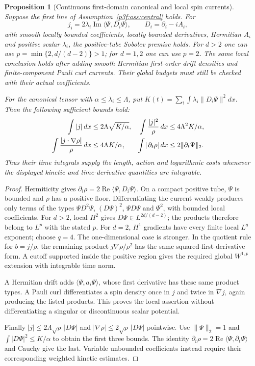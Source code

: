 \documentclass[11pt]{article}
\numberwithin{equation}{section}
\newtheorem{proposition}[theorem]{Proposition}
\theoremstyle{definition}
\theoremstyle{remark}
\begin{document}
\begin{proposition}[Continuous first-domain canonical and local spin currents]
\label{p3f:prop:canonical}
Suppose the first line of Assumption~\ref{p3f:ass:central} holds.
For
\[
 j_i=2\lambda_i\operatorname{Im}\langle\Psi,D_i\Psi\rangle,
 \qquad D_i=\partial_i-iA_i,
\]
with smooth locally bounded coefficients, locally bounded derivatives,
Hermitian $A_i$ and positive scalar $\lambda_i$, the positive-tube
Sobolev premise holds. For $d>2$ one can use
$p=\min\{2,d/(d-2)\}>1$; for $d=1,2$ one can use $p=2$.
The same local conclusion holds after adding smooth Hermitian
first-order drift densities and finite-component Pauli curl currents.
Their global budgets must still be checked with their actual
coefficients.

For the canonical tensor with $\alpha\leq\lambda_i\leq\Lambda$,
put $K(t)=\sum_i\int\lambda_i\|D_i\Psi\|^2dx$. Then the following
sufficient bounds hold:
\begin{align}
 \int|j|\,dx&\leq2\Lambda\sqrt{K/\alpha},&
 \int\frac{|j|^2}{\rho}\,dx&\leq4\Lambda^2K/\alpha,\notag\\
 \int\frac{|j\cdot\nabla\rho|}{\rho}\,dx
 &\leq4\Lambda K/\alpha,&
 \int|\partial_t\rho|\,dx&\leq2\|\partial_t\Psi\|_2.
 \label{p3f:eq:canonicalbudgets}
\end{align}
Thus their time integrals supply the length, action and logarithmic
costs whenever the displayed kinetic and time-derivative quantities
are integrable.
\end{proposition}

\begin{proof}
Hermiticity gives
$\partial_i\rho=2\operatorname{Re}\langle\Psi,D_i\Psi\rangle$.
On a compact positive tube, $\Psi$ is bounded and $\rho$ has a
positive floor. Differentiating the current weakly produces only
terms of the types $\Psi D^2\Psi$, $(D\Psi)^2$,
$\Psi D\Psi$ and $\Psi^2$, with bounded local coefficients.
For $d>2$, local $H^2$ gives $D\Psi\in L^{2d/(d-2)}$;
the products therefore belong to $L^p$ with the stated $p$.
For $d=2$, $H^1$ gradients have every finite local $L^q$ exponent;
choose $q=4$. The one-dimensional case is stronger.
In the quotient rule for $b=j/\rho$, the remaining product
$j\nabla\rho/\rho^2$ has the same squared-first-derivative form.
A cutoff supported inside the positive region gives the required
global $W^{1,p}$ extension with integrable time norm.

A Hermitian drift adds $\langle\Psi,a_i\Psi\rangle$, whose first
derivative has these same product types. A Pauli curl differentiates
a spin density once in $j$ and twice in $\nabla j$, again producing
the listed products. This proves the local assertion without
differentiating a singular or discontinuous scalar potential.

Finally
$|j|\leq2\Lambda\sqrt\rho\,|D\Psi|$ and
$|\nabla\rho|\leq2\sqrt\rho\,|D\Psi|$ pointwise.
Use $\|\Psi\|_2=1$ and $\int|D\Psi|^2\leq K/\alpha$ to obtain
the first three bounds. The identity
$\partial_t\rho=2\operatorname{Re}\langle\Psi,\partial_t\Psi\rangle$
and Cauchy give the last. Variable unbounded coefficients instead
require their corresponding weighted kinetic estimates.
\end{proof}
\end{document}
